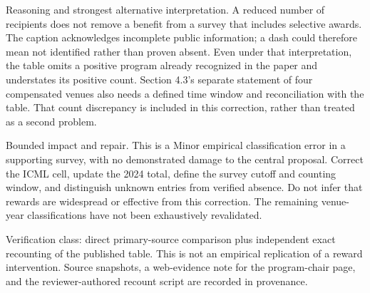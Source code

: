 \documentclass[10pt]{article}
\begin{document}
Reasoning and strongest alternative interpretation. A reduced number of recipients does not remove a benefit from a survey that includes selective awards. The caption acknowledges incomplete public information; a dash could therefore mean not identified rather than proven absent. Even under that interpretation, the table omits a positive program already recognized in the paper and understates its positive count. Section 4.3’s separate statement of four compensated venues also needs a defined time window and reconciliation with the table. That count discrepancy is included in this correction, rather than treated as a second problem.\par
Bounded impact and repair. This is a Minor empirical classification error in a supporting survey, with no demonstrated damage to the central proposal. Correct the ICML cell, update the 2024 total, define the survey cutoff and counting window, and distinguish unknown entries from verified absence. Do not infer that rewards are widespread or effective from this correction. The remaining venue-year classifications have not been exhaustively revalidated.\par
Verification class: direct primary-source comparison plus independent exact recounting of the published table. This is not an empirical replication of a reward intervention. Source snapshots, a web-evidence note for the program-chair page, and the reviewer-authored recount script are recorded in provenance.\par
\end{document}
